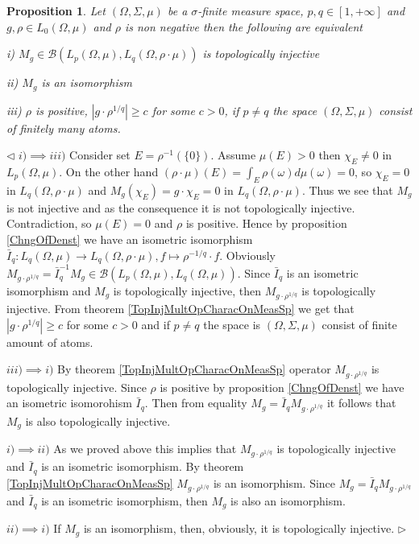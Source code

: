 \documentclass[12pt]{article}
\newtheorem{proposition}[theorem]{Proposition}
\newenvironment{proof}{\par $\triangleleft$}{$\triangleright$}
\begin{document}
\begin{proposition}\label{TopInjMultOpCharacBtwnTwoContMeasSp} Let $(\Omega,\Sigma,\mu)$ be a $\sigma$-finite measure space, $p,q\in[1,+\infty]$ and $g,\rho\in L_0(\Omega,\mu)$ and $\rho$ is non negative then the following are equivalent

i) $M_g\in\mathcal{B}(L_p(\Omega,\mu),L_q(\Omega,\rho\cdot\mu))$ is topologically injective

ii) $M_g$ is an isomorphism

iii) $\rho$ is  positive, $|g\cdot \rho^{1/q}|\geq c$ for some $c>0$, if $p\neq q$ the space $(\Omega,\Sigma,\mu)$ consist of finitely many atoms.
\end{proposition}
\begin{proof} $i)\implies iii)$ Consider set $E=\rho^{-1}(\{0\})$. Assume $\mu(E)>0$ then $\chi_E\neq 0$ in $L_p(\Omega,\mu)$. On the other hand $(\rho\cdot\mu)(E)=\int_E\rho(\omega)d\mu(\omega)=0$, so $\chi_E=0$ in $L_q(\Omega,\rho\cdot\mu)$ and $M_g(\chi_E)=g\cdot\chi_E=0$ in $L_q(\Omega,\rho\cdot\mu)$. Thus we see that $M_g$ is not injective and as the consequence it is not topologically injective. Contradiction, so $\mu(E)=0$ and $\rho$ is  positive. Hence by proposition \ref{ChngOfDenst} we have an isometric isomorphism $\bar{I}_q:L_q(\Omega,\mu)\to L_q(\Omega,\rho\cdot\mu),f\mapsto \rho^{-1/q}\cdot f$. Obviously $M_{g\cdot\rho^{1/q}}=\bar{I}_q^{-1} M_g\in\mathcal{B}(L_p(\Omega,\mu),L_q(\Omega,\mu))$. Since $\bar{I}_q$ is an isometric isomorphism and $M_g$ is topologically injective, then $M_{g\cdot \rho^{1/q}}$ is topologically injective. From theorem \ref{TopInjMultOpCharacOnMeasSp} we get that $|g\cdot\rho^{1/q}|\geq c$ for some $c>0$ and if $p\neq q$ the space is $(\Omega,\Sigma,\mu)$ consist of finite amount of atoms.

$iii)\implies i)$ By theorem \ref{TopInjMultOpCharacOnMeasSp} operator $M_{g\cdot\rho^{1/q}}$ is topologically injective. Since $\rho$ is positive by proposition \ref{ChngOfDenst} we have an isometric isomorohism $\bar{I}_q$. Then from equality $M_g=\bar{I}_q M_{g\cdot\rho^{1/q}}$ it follows that $M_g$ is also topologically injective.

$i)\implies ii)$ As we proved above this implies that $M_{g\cdot\rho^{1/q}}$ is topologically injective and $\bar{I}_q$ is an isometric isomorphism. By theorem \ref{TopInjMultOpCharacOnMeasSp} $M_{g\cdot\rho^{1/q}}$ is an isomorphism. Since $M_g=\bar{I}_q M_{g\cdot\rho^{1/q}}$ and $\bar{I}_q$ is an isometric isomorphism, then $M_g$ is also an isomorphism.

$ii)\implies i)$ If $M_g$ is an isomorphism, then, obviously, it is topologically injective.
\end{proof}
\end{document}

